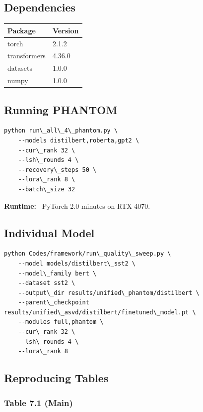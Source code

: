 \subsection{Dependencies}

\begin{table}[H]
\centering
\small
\begin{tabular}{ll}
\toprule
\textbf{Package} & \textbf{Version} \\
\midrule
torch & 2.1.2 \\
transformers & 4.36.0 \\
datasets & 1.0.0 \\
numpy & 1.0.0 \\
\bottomrule
\end{tabular}
\end{table}

\subsection{Running PHANTOM}

\begin{lstlisting}
python run\_all\_4\_phantom.py \
    --models distilbert,roberta,gpt2 \
    --cur\_rank 32 \
    --lsh\_rounds 4 \
    --recovery\_steps 50 \
    --lora\_rank 8 \
    --batch\_size 32
\end{lstlisting}

\textbf{Runtime:} ~PyTorch 2.0 minutes on RTX 4070.

\subsection{Individual Model}

\begin{lstlisting}
python Codes/framework/run\_quality\_sweep.py \
    --model models/distilbert\_sst2 \
    --model\_family bert \
    --dataset sst2 \
    --output\_dir results/unified\_phantom/distilbert \
    --parent\_checkpoint results/unified\_asvd/distilbert/finetuned\_model.pt \
    --modules full,phantom \
    --cur\_rank 32 \
    --lsh\_rounds 4 \
    --lora\_rank 8
\end{lstlisting}

\subsection{Reproducing Tables}

\subsubsection{Table 7.1 (Main)}

